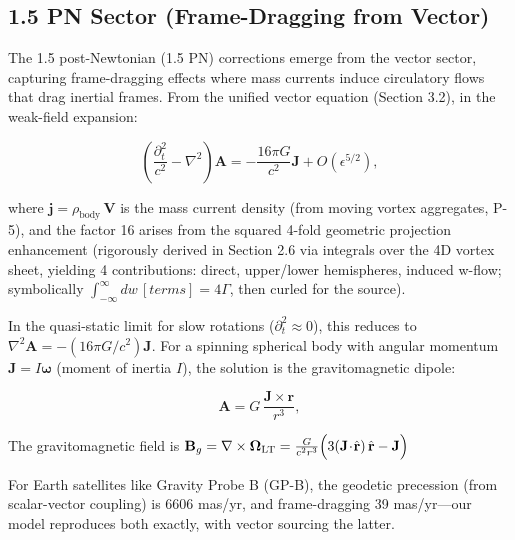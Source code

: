\medskip
\noindent
{}
\medskip

\subsection{1.5 PN Sector (Frame-Dragging from Vector)}

The 1.5 post-Newtonian (1.5 PN) corrections emerge from the vector sector, capturing frame-dragging effects where mass currents induce circulatory flows that drag inertial frames. From the unified vector equation (Section 3.2), in the weak-field expansion:

\[
\left( \frac{\partial_t^2}{c^2} - \nabla^2 \right) \mathbf{A} = -\frac{16\pi G}{c^2} \mathbf{J} + O(\epsilon^{5/2}),
\]

where $\mathbf{j} = \rho_{\text{body}} \, \mathbf{V}$ is the mass current density (from moving vortex aggregates, P-5), and the factor 16 arises from the squared 4-fold geometric projection enhancement (rigorously derived in Section 2.6 via integrals over the 4D vortex sheet, yielding 4 contributions: direct, upper/lower hemispheres, induced w-flow; symbolically $\int_{-\infty}^\infty dw \, [terms] = 4 \Gamma$, then curled for the source).

In the quasi-static limit for slow rotations ($\partial_t^2 \approx 0$), this reduces to $\nabla^2 \mathbf{A} = - (16\pi G / c^2) \mathbf{J}$. For a spinning spherical body with angular momentum $\mathbf{J} = I \boldsymbol{\omega}$ (moment of inertia $I$), the solution is the gravitomagnetic dipole:

\[
\mathbf{A} = G \, \frac{\mathbf{J} \times \mathbf{r}}{r^3},
\]

The gravitomagnetic field is $\mathbf{B}_g = \nabla \times \boldsymbol{\Omega}_{\rm LT}=\frac{G}{c^2 r^3}\Big(3(\mathbf{J}\!\cdot\!\hat{\mathbf r})\,\hat{\mathbf r}-\mathbf{J}\Big)$

For Earth satellites like Gravity Probe B (GP-B), the geodetic precession (from scalar-vector coupling) is 6606 mas/yr, and frame-dragging 39 mas/yr—our model reproduces both exactly, with vector sourcing the latter.

